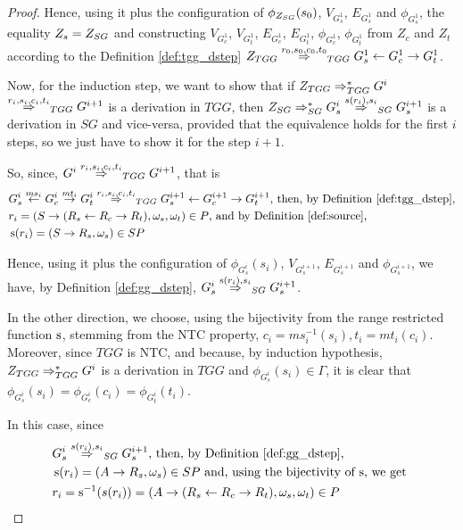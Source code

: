 \begin{proof}
	Hence, using it plus the configuration of $\phi_{Z_{SG}}(s_0)$, $V_{G^1_s}$, $E_{G^1_s}$ and $\phi_{G^1_s}$, the equality $Z_s = Z_{SG}$ and constructing $V_{G^1_c}$, $V_{G^1_t}$, $E_{G^1_c}$, $E_{G^1_t}$, $\phi_{G^1_c}$, $\phi_{G^1_t}$ from $Z_c$ and $Z_t$ according to the Definition \ref{def:tgg_dstep} $\startTG{TGG} \tderiv{r_0}{s_0,c_0,t_0}{TGG} G^1_s \ms{} G^1_c \mt{} G^1_t$.
	
	Now, for the induction step, we want to show that if $Z_{TGG} \Rightarrow^*_{TGG} G^i$ $\tderiv{r_{i}}{s_{i},c_{i},t_{i}}{TGG} G^{i+1}$ is a derivation in $TGG$, then $\startG{SG} \derivtr{SG} G^i_s \deriv{s(r_{i})}{s_{i}}{SG} G^{i+1}_s$ is a derivation in $SG$ and vice-versa, provided that the equivalence holds for the first $i$ steps, so we just have to show it for the step $i+1$.
	
	So, since, $G^i \tderiv{r_{i}}{s_{i},c_{i},t_{i}}{TGG} G^{i+1}$, that is
	\begin{align*}
		& G^i_s \ms{ms_i} G^i_c \mt{mt_i} G^i_t \tderiv{r_i}{s_i,c_i,t_i}{TGG} G^{i+1}_s \ms{} G^{i+1}_c \mt{} G^{i+1}_t \text{, then, by Definition \ref{def:tgg_dstep},}\\
		& r_i = (S \pro (R_s \ms{} R_c \mt{} R_t), \omega_s, \omega_t) \in P \text{, and by Definition \ref{def:source},}\\
		& \source(r_i) = (S \pro R_s, \omega_s) \in SP
	\end{align*}
	
	Hence, using it plus the configuration of $\phi_{G^i_s}(s_i)$, $V_{G^{i+1}_s}$, $E_{G^{i+1}_s}$ and $\phi_{G^{i+1}_s}$, we have, by Definition \ref{def:gg_dstep}, $G_s^i \deriv{\source(r_i)}{s_i}{SG} G^{i+1}_s$.
	
	In the other direction, we choose, using the bijectivity from the range restricted function $\operatorname{s}$, stemming from the NTC property, $c_i = ms_i^{-1}(s_i), t_i = mt_i(c_i)$. Moreover, since $TGG$ is NTC, and because, by induction hypothesis, $Z_{TGG} \Rightarrow^*_{TGG} G^i$ is a derivation in $TGG$ and $\phi_{G^i_s}(s_i) \in \Gamma$, it is clear that $\phi_{G^i_s}(s_i) = \phi_{G^i_c}(c_i) = \phi_{G^i_t}(t_i)$.
	
	In this case, since
	\begin{align*}
		& G^{i}_s \deriv{s(r_i)}{s_i}{SG} G^{i+1}_s \text{, then, by Definition \ref{def:gg_dstep},}\\
		& \source(r_i) = (A \pro R_s, \omega_s) \in SP \text{ and, using the bijectivity of $\source$, we get }\\
		& r_i = \source^{-1}(s(r_i)) = (A \pro (R_s \ms{} R_c \mt{} R_t), \omega_s, \omega_t) \in P
	\end{align*} 
	

\end{proof}

